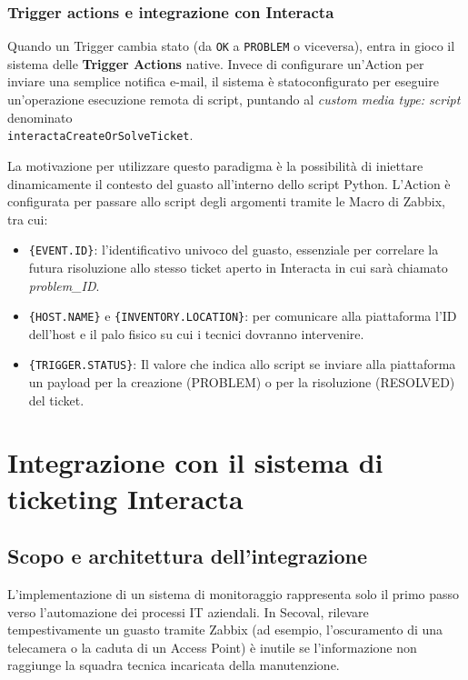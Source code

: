 \documentclass[12pt, a4paper, oneside]{report}
\begin{document}
\subsection{Trigger actions e integrazione con Interacta}
Quando un Trigger cambia stato (da \texttt{OK} a \texttt{PROBLEM} o viceversa), entra in gioco il sistema delle  \textbf{Trigger Actions} native. Invece di configurare un'Action per inviare una semplice notifica e-mail, il sistema è statoconfigurato per eseguire un'operazione esecuzione remota di script, puntando al \textit{custom media type: script} denominato \\\texttt{interactaCreateOrSolveTicket}.

La motivazione per utilizzare questo paradigma è la possibilità di iniettare dinamicamente il contesto del guasto all'interno dello script Python. L'Action è configurata per passare allo script degli argomenti tramite le Macro di Zabbix, tra cui:
\begin{itemize}
    \item \texttt{\{EVENT.ID\}}: l'identificativo univoco del guasto, essenziale per correlare la futura risoluzione allo stesso ticket aperto in Interacta in cui sarà chiamato \textit{problem\_ID}.
    \item \texttt{\{HOST.NAME\}} e \texttt{\{INVENTORY.LOCATION\}}: per comunicare alla piattaforma l'ID dell'host e il palo fisico su cui i tecnici dovranno intervenire.
    \item \texttt{\{TRIGGER.STATUS\}}: Il valore che indica allo script se inviare alla piattaforma un payload per la creazione (PROBLEM) o per la risoluzione (RESOLVED) del ticket.
\end{itemize}

\chapter{Integrazione con il sistema di ticketing Interacta}
\section{Scopo e architettura dell'integrazione}

L'implementazione di un sistema di monitoraggio rappresenta solo il primo passo verso l'automazione dei processi IT aziendali. In Secoval, rilevare tempestivamente un guasto tramite Zabbix (ad esempio, l'oscuramento di una telecamera o la caduta di un Access Point) è inutile se l'informazione non raggiunge la squadra tecnica incaricata della manutenzione.
\end{document}
